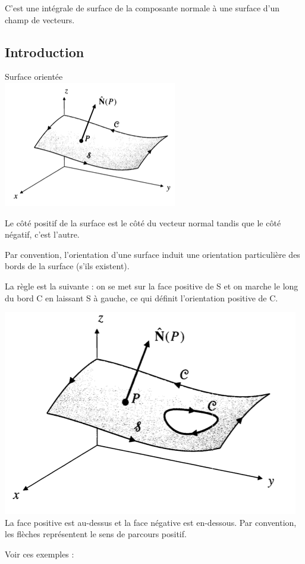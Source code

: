 C'est une intégrale de surface de la composante normale à une surface d'un champ de vecteurs.

\subsection{Introduction}
 Surface orientée\\
 \includegraphics[scale=0.6]{image5.png}

 Le côté positif de la surface est le côté du vecteur normal tandis que le côté négatif, c'est l'autre.

 Par convention, l'orientation d'une surface induit une orientation particulière des bords de la surface (s'ils existent).

 La règle est la suivante : on se met sur la face positive de S et on marche le long du bord C en laissant S à gauche, ce qui définit l'orientation positive de C.

 \includegraphics[scale=0.7]{image6.png}
 La face positive est au-dessus et la face négative est en-dessous. Par convention, les flèches représentent le sens de parcours positif.

 Voir ces exemples :

